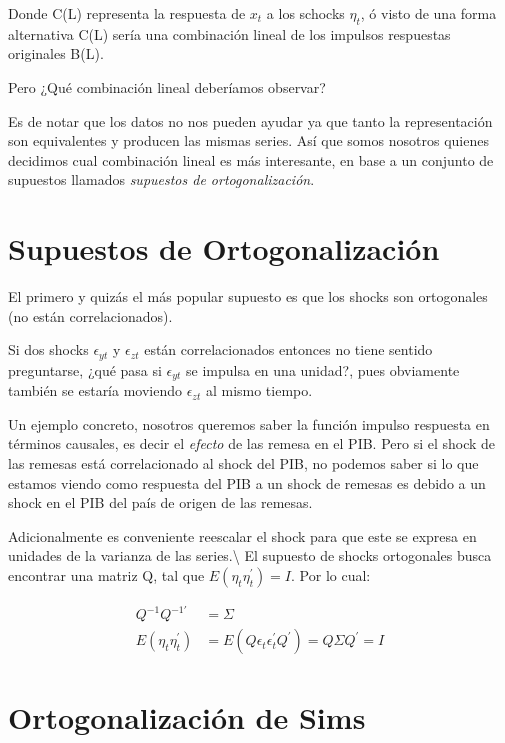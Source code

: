 \documentclass[
]{book}
\begin{document}
Donde C(L) representa la respuesta de \(x_{t}\) a los schocks \(\eta_{t}\), ó visto de una forma alternativa C(L) sería una combinación lineal de los impulsos respuestas originales B(L).

Pero ¿Qué combinación lineal deberíamos observar?

Es de notar que los datos no nos pueden ayudar ya que tanto la representación son equivalentes y producen las mismas series. Así que somos nosotros quienes decidimos cual combinación lineal es más interesante, en base a un conjunto de supuestos llamados \emph{supuestos de ortogonalización}.

\hypertarget{supuestos-de-ortogonalizaciuxf3n}{%
\section{Supuestos de Ortogonalización}\label{supuestos-de-ortogonalizaciuxf3n}}

El primero y quizás el más popular supuesto es que los shocks son ortogonales (no están correlacionados).

Si dos shocks \(\epsilon_{yt}\) y \(\epsilon_{zt}\) están correlacionados entonces no tiene sentido preguntarse, ¿qué pasa si \(\epsilon_{yt}\) se impulsa en una unidad?, pues obviamente también se estaría moviendo \(\epsilon_{zt}\) al mismo tiempo.

Un ejemplo concreto, nosotros queremos saber la función impulso respuesta en términos causales, es decir el \emph{efecto} de las remesa en el PIB. Pero si el shock de las remesas está correlacionado al shock del PIB, no podemos saber si lo que estamos viendo como respuesta del PIB a un shock de remesas es debido a un shock en el PIB del país de origen de las remesas.

Adicionalmente es conveniente reescalar el shock para que este se expresa en unidades de la varianza de las series.\textbackslash{}
El supuesto de shocks ortogonales busca encontrar una matriz Q, tal que \(E(\eta_{t}\eta_{t}^{'})=I\). Por lo cual:

\begin{align}
Q^{-1}Q^{-1'}&=\Sigma \\
E(\eta_{t}\eta_{t}^{'})&=E(Q\epsilon_{t}\epsilon_{t}^{'}Q^{'})=Q\Sigma Q^{'}=I\nonumber
\end{align}

\hypertarget{ortogonalizaciuxf3n-de-sims}{%
\section{Ortogonalización de Sims}\label{ortogonalizaciuxf3n-de-sims}}
\end{document}
